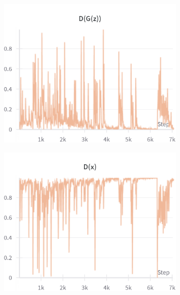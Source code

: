 \begin{figure}[H]
    \begin{subfigure}{0.45\textwidth}
        \centering
        \includegraphics[width=0.95\linewidth]{ndf/128/D_G_z.png}
        \caption{}
        \label{subfig:ndf/128/D_G_z}
    \end{subfigure}%
    \begin{subfigure}{0.45\textwidth}
        \centering
        \includegraphics[width=0.95\linewidth]{ndf/128/D_x.png}
        \caption{}
        \label{subfig:ndf/128/D_x}
    \end{subfigure}


\end{figure}
